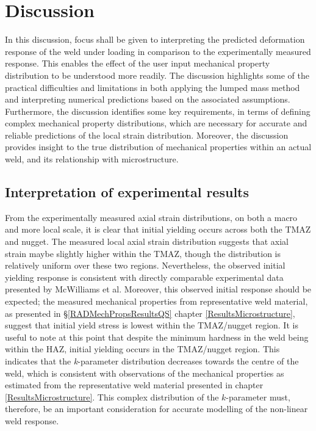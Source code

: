 \section{Discussion}
\label{Discussion}
In this discussion, focus shall be given to interpreting the predicted deformation response of the weld under loading in comparison to the experimentally measured response. This enables the effect of the user input mechanical property distribution to be understood more readily. The discussion highlights some of the practical difficulties and limitations in both applying the lumped mass method and interpreting numerical predictions based on the associated assumptions. Furthermore, the discussion identifies some key requirements, in terms of defining complex mechanical property distributions, which are necessary for accurate and reliable predictions of the local strain distribution. Moreover, the discussion provides insight to the true distribution of mechanical properties within an actual weld, and its relationship with microstructure.

\subsection{Interpretation of experimental results}
\label{SMDModellingstudyDiscussionReality}
From the experimentally measured axial strain distributions, on both a macro and more local scale, it is clear that initial yielding occurs across both the TMAZ and nugget. The measured local axial strain distribution suggests that axial strain maybe slightly higher within the TMAZ, though the distribution is relatively uniform over these two regions. Nevertheless, the observed initial yielding response is consistent with directly comparable experimental data presented by McWilliams et al. \cite{McWilliams2013} Moreover, this observed initial response should be expected; the measured mechanical properties from representative weld material, as presented in \S\ref{RADMechPropsResultsQS} chapter \ref{ResultsMicrostructure}, suggest that initial yield stress is lowest within the TMAZ/nugget region. It is useful to note at this point that despite the minimum hardness in the weld being within the HAZ, initial yielding occurs in the TMAZ/nugget region. This indicates that the \textit{k}-parameter distribution decreases towards the centre of the weld, which is consistent with observations of the mechanical properties as estimated from the representative weld material presented in chapter \ref{ResultsMicrostructure}. This complex distribution of the $k$-parameter must, therefore, be an important consideration for accurate modelling of the non-linear weld response.  

